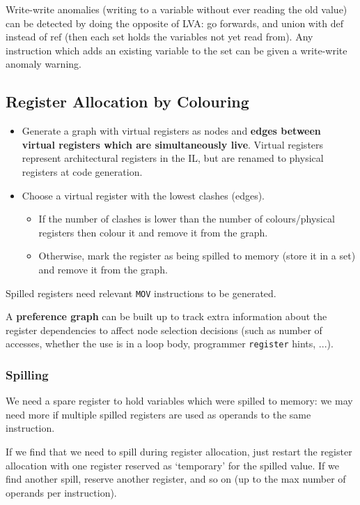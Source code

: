 \documentclass[a4paper, 11pt]{article}
\begin{document}
{{        Write-write anomalies (writing to a variable without ever reading the old value) can be detected by doing the opposite of LVA: go forwards, and union with \(\text{def}\) instead of \(\text{ref}\) (then each set holds the variables not yet read from). Any instruction which adds an existing variable to the set can be given a write-write anomaly warning.
    }
    \subsection*{Register Allocation by Colouring}
    {
        \begin{itemize}
        \item Generate a graph with virtual registers as nodes and \textbf{edges between virtual registers which are simultaneously live}. Virtual registers represent architectural registers in the IL, but are renamed to physical registers at code generation.
        \item
        {
            Choose a virtual register with the lowest clashes (edges).

            \begin{itemize}
            \item If the number of clashes is lower than the number of colours/physical registers then colour it and remove it from the graph.
            \item Otherwise, mark the register as being spilled to memory (store it in a set) and remove it from the graph.
            \end{itemize}
        }
        \end{itemize}
            
        Spilled registers need relevant \texttt{MOV} instructions to be generated.

        A \textbf{preference graph} can be built up to track extra information about the register dependencies to affect node selection decisions (such as number of accesses, whether the use is in a loop body, programmer \texttt{register} hints, ...).

        \subsubsection*{Spilling}
        {
            We need a spare register to hold variables which were spilled to memory: we may need more if multiple spilled registers are used as operands to the same instruction.

            If we find that we need to spill during register allocation, just restart the register allocation with one register reserved as `temporary' for the spilled value. If we find another spill, reserve another register, and so on (up to the max number of operands per instruction).
        }
}}
\end{document}
